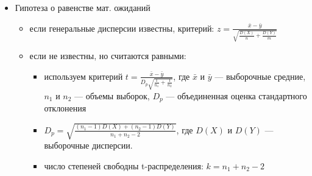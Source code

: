 \documentclass[a4paper,11pt]{article}
\newenvironment{shdd}{\begin{mdframed}[backgroundcolor=shadecolor]}{\end{mdframed}}
\theoremstyle{definition}
\begin{document}
\begin{shdd}
\begin{itemize}
            \item Гипотеза о равенстве мат. ожиданий
            \begin{itemize}
                \item если генеральные дисперсии известны, критерий: \(z = \frac{\bar{x} - \bar{y}}{\sqrt{\frac{D(X)}{n} + \frac{D(Y)}{m}}}\)
                \item если не известны, но считаются равными:
                \begin{itemize}
                    \item используем критерий \(t = \frac{\bar{x} - \bar{y}}{D_p \sqrt{\frac{1}{n_1} + \frac{1}{n_2}}}\),
                    где \(\bar{x}\) и \(\bar{y}\) — выборочные средние, \(n_1\) и \(n_2\) — объемы выборок, \(D_p\) — объединенная оценка стандартного отклонения
                    \item \(D_p = \sqrt{\frac{(n_1 - 1)D(X) + (n_2 - 1)D(Y)}{n_1 + n_2 - 2}}\), где \(D(X)\) и \(D(Y)\) — выборочные дисперсии.
                    \item число степеней свободны t-распределения: \(k = n_1 + n_2 - 2\)
                \end{itemize}
            \end{itemize}
        \end{itemize}
    \end{shdd}
    \vspace{10pt}
\end{document}
